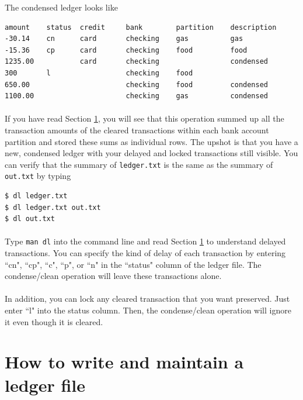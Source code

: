 \documentclass{article}
\providecommand{\q}{$\quad$ \newline}
\begin{document}
\begin{flushleft}
The condensed ledger looks like

\begin{lstlisting}[title=out.txt]
amount    status  credit     bank        partition    description
-30.14    cn      card       checking    gas          gas
-15.36    cp      card       checking    food         food
1235.00           card       checking                 condensed
300       l                  checking    food    
650.00                       checking    food         condensed
1100.00                      checking    gas          condensed
\end{lstlisting} 

\paragraph{} If you have read Section \ref{sec:file}, you will see that this operation summed up all the transaction amounts of the cleared transactions within each bank account partition and stored these sums as individual rows. The upshot is that you have a new, condensed ledger with your delayed and locked transactions still visible. You can verify that the summary of {\tt ledger.txt} is the same as the summary of {\tt out.txt} by typing \q

\begin{lstlisting}
$ dl ledger.txt
$ dl ledger.txt out.txt
$ dl out.txt
\end{lstlisting} 

\paragraph{} Type {\tt man dl} into the command line and read Section \ref{sec:file} to understand delayed transactions. You can specify the kind of delay of each transaction by entering ``cn", ``cp", ``c", ``p", or ``n" in the ``status" column of the ledger file. The condense/clean operation will leave these transactions alone. 

\paragraph{} In addition, you can lock any cleared transaction that you want preserved. Just enter ``l" into the status column. Then, the condense/clean operation will ignore it even though it is cleared.



\section{How to write and maintain a ledger file} \label{sec:file}


\end{flushleft}
\end{document}
